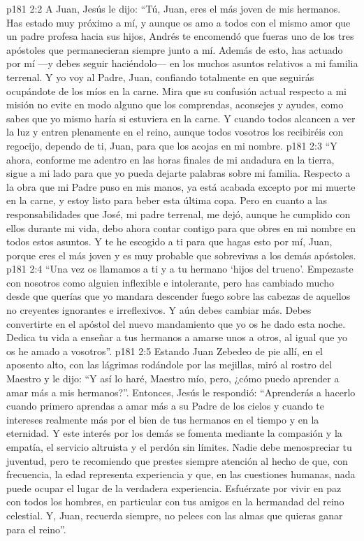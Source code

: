 \vs p181 2:2 \pc A Juan, Jesús le dijo: “Tú, Juan, eres el más joven de mis hermanos. Has estado muy próximo a mí, y aunque os amo a todos con el mismo amor que un padre profesa hacia sus hijos, Andrés te encomendó que fueras uno de los tres apóstoles que permanecieran siempre junto a mí. Además de esto, has actuado por mí ---y debes seguir haciéndolo--- en los muchos asuntos relativos a mi familia terrenal. Y yo voy al Padre, Juan, confiando totalmente en que seguirás ocupándote de los míos en la carne. Mira que su confusión actual respecto a mi misión no evite en modo alguno que los comprendas, aconsejes y ayudes, como sabes que yo mismo haría si estuviera en la carne. Y cuando todos alcancen a ver la luz y entren plenamente en el reino, aunque todos vosotros los recibiréis con regocijo, dependo de ti, Juan, para que los acojas en mi nombre.
\vs p181 2:3 “Y ahora, conforme me adentro en las horas finales de mi andadura en la tierra, sigue a mi lado para que yo pueda dejarte palabras sobre mi familia. Respecto a la obra que mi Padre puso en mis manos, ya está acabada excepto por mi muerte en la carne, y estoy listo para beber esta última copa. Pero en cuanto a las responsabilidades que José, mi padre terrenal, me dejó, aunque he cumplido con ellos durante mi vida, debo ahora contar contigo para que obres en mi nombre en todos estos asuntos. Y te he escogido a ti para que hagas esto por mí, Juan, porque eres el más joven y es muy probable que sobrevivas a los demás apóstoles.
\vs p181 2:4 “Una vez os llamamos a ti y a tu hermano ‘hijos del trueno’. Empezaste con nosotros como alguien inflexible e intolerante, pero has cambiado mucho desde que querías que yo mandara descender fuego sobre las cabezas de aquellos no creyentes ignorantes e irreflexivos. Y aún debes cambiar más. Debes convertirte en el apóstol del nuevo mandamiento que yo os he dado esta noche. Dedica tu vida a enseñar a tus hermanos a amarse unos a otros, al igual que yo os he amado a vosotros”.
\vs p181 2:5 Estando Juan Zebedeo de pie allí, en el aposento alto, con las lágrimas rodándole por las mejillas, miró al rostro del Maestro y le dijo: “Y así lo haré, Maestro mío, pero, ¿cómo puedo aprender a amar más a mis hermanos?”. Entonces, Jesús le respondió: “Aprenderás a hacerlo cuando primero aprendas a amar más a su Padre de los cielos y cuando te intereses realmente más por el bien de tus hermanos en el tiempo y en la eternidad. Y este interés por los demás se fomenta mediante la compasión y la empatía, el servicio altruista y el perdón sin límites. Nadie debe menospreciar tu juventud, pero te recomiendo que prestes siempre atención al hecho de que, con frecuencia, la edad representa experiencia y que, en las cuestiones humanas, nada puede ocupar el lugar de la verdadera experiencia. Esfuérzate por vivir en paz con todos los hombres, en particular con tus amigos en la hermandad del reino celestial. Y, Juan, recuerda siempre, no pelees con las almas que quieras ganar para el reino”.

